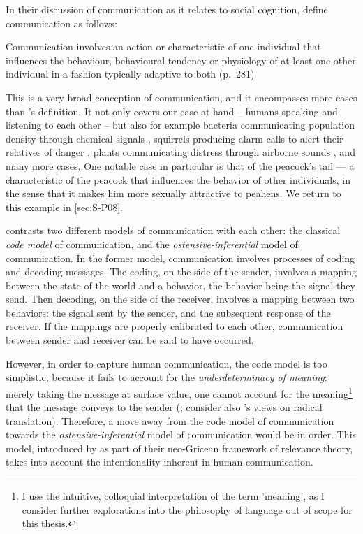 In their discussion of communication as it relates to social cognition, \citet{Freeberg19} define communication as follows:
\begin{quoting}
    Communication involves an action or characteristic of one individual that influences the behaviour, behavioural tendency or physiology of at least one other individual in a fashion typically adaptive to both
    \hfill (p.~281)
\end{quoting}
This is a very broad conception of communication, and it encompasses more cases than \citeauthor{DawkinsKrebs78}'s definition. It not only covers our case at hand -- humans speaking and listening to each other -- but also for example bacteria communicating population density through chemical signals \citep{Federle03}, squirrels producing alarm calls to alert their relatives of danger \citep{Sherman77}, plants communicating distress through airborne sounds \citep{Khait23}, and many more cases. One notable case in particular is that of the peacock's tail --- a characteristic of the peacock that influences the behavior of other individuals, in the sense that it makes him more sexually attractive to peahens. We return to this example in \cref{sec:S-P08}.

\citet{Scott-Phillips15-primate} contrasts two different models of communication with each other: the classical \emph{code model} of communication, and the \emph{ostensive-inferential} model of communication.
In the former model, communication involves processes of coding and decoding messages. The coding, on the side of the sender, involves a mapping between the state of the world and a behavior, the behavior being the signal they send. Then decoding, on the side of the receiver, involves a mapping between two behaviors: the signal sent by the sender, and the subsequent response of the receiver. If the mappings are properly calibrated to each other, communication between sender and receiver can be said to have occurred.

However, in order to capture human communication, the code model is too simplistic, because it fails to account for the \emph{underdeterminacy of meaning}: merely taking the message at surface value, one cannot account for the meaning\footnote{I use the intuitive, colloquial interpretation of the term 'meaning', as I consider further explorations into the philosophy of language out of scope for this thesis.} that the message conveys to the sender (\citet{Scott-Phillips18-communication}; consider also \citet{Quine60}'s views on radical translation).
Therefore, a move away from the code model of communication towards the \emph{ostensive-inferential} model of communication would be in order. This model, introduced by \citet{SperberWilson86} as part of their neo-Gricean framework of relevance theory, takes into account the intentionality inherent in human communication.

